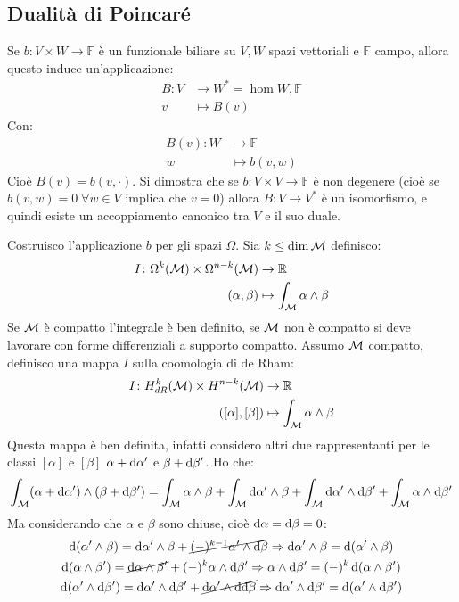\subsection{Dualità di Poincaré}
\begin{osservation}
  Se $ b \colon V \times W \to \mathbb{F} $ è un funzionale biliare su $ V,W $ spazi
  vettoriali e $ \mathbb{F} $ campo, allora questo induce un'applicazione:
  \begin{align*}
    B \colon V & \to W^* = \hom{W, \mathbb{F}} \\
    v & \mapsto B(v)
  \end{align*}
  Con:
  \begin{align*}
    B(v) \colon W & \to \mathbb{F} \\
    w & \mapsto b(v,w)
  \end{align*}
  Cioè $ B(v) = b(v, \cdot) $. Si dimostra che se $ b \colon V \times V \to \mathbb{F} $
  è non degenere (cioè se $ b(v,w) = 0 \; \forall w \in V $ implica che $ v = 0$) allora
  $ B \colon V \to V^* $ è un isomorfismo, e quindi esiste un accoppiamento canonico tra
  $ V $ e il suo duale.
\end{osservation}
Costruisco l'applicazione $ b $ per gli spazi $ \Omega $. Sia $ k \leq \dim \mathcal{M} $ definisco:
\begin{align*}
  I \colon \Omega^k(\mathcal{M}) \times \Omega^{n-k}(\mathcal{M}) & \to \mathbb{R}^{} \\
  (\alpha,\beta) & \mapsto \int_{\mathcal{M}} \alpha \wedge \beta
\end{align*}
Se $ \mathcal{M} $ è compatto l'integrale è ben definito, se $ \mathcal{M} $ non è compatto si
deve lavorare con forme differenziali a supporto compatto. Assumo $ \mathcal{M} $
compatto, definisco una mappa $ I $ sulla coomologia di de Rham:
\begin{align*}
  I \colon H^k_{dR}(\mathcal{M}) \times H^{n-k}(\mathcal{M}) & \to \mathbb{R}^{} \\
  ([\alpha], [\beta]) & \mapsto \int_{\mathcal{M}} \alpha \wedge \beta
\end{align*}
Questa mappa è ben definita, infatti considero altri due rappresentanti per le
classi $ [\alpha] $ e $ [\beta] $ $ \alpha + \operatorname{d}\!{\alpha}' $ e $ \beta + \operatorname{d}\!{\beta}' $. Ho che:
\[
  \int_{\mathcal{M}} (\alpha + \operatorname{d}\!{\alpha}') \wedge (\beta + \operatorname{d}\!{\beta}') = \int_{\mathcal{M}} \alpha \wedge \beta + \int_{\mathcal{M}} \operatorname{d}\!{\alpha}' \wedge \beta + \int_{\mathcal{M}} \operatorname{d}\!{\alpha}' \wedge \operatorname{d}\!{\beta}' + \int_{\mathcal{M}} \alpha \wedge \operatorname{d}\!{\beta}'
\]
Ma considerando che $ \alpha $ e $ \beta $ sono chiuse, cioè $ \operatorname{d}\!{\alpha} = \operatorname{d}\!{\beta} = 0 $:
\begin{gather*}
  \d (\alpha' \wedge \beta) = \d \alpha' \wedge \beta + \cancel{(-)^{k-1} \alpha' \wedge \d \beta} \Rightarrow  \d \alpha' \wedge \beta = \d (\alpha' \wedge \beta) \\
  \d (\alpha \wedge \beta') = \cancel{\d \alpha \wedge \beta'} + (-)^{k} \alpha \wedge \d \beta' \Rightarrow  \alpha \wedge \d \beta' = (-)^k  \d (\alpha \wedge \beta') \\
  \d (\alpha' \wedge \d \beta') = \d \alpha' \wedge \d \beta' + \cancel{\d \alpha' \wedge \d {\d \beta}} \Rightarrow \d \alpha' \wedge \d \beta' =  \d (\alpha' \wedge \d \beta')
\end{gather*}
